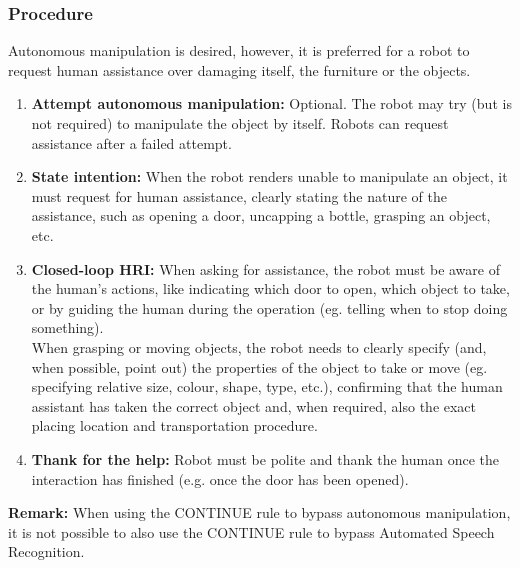 \subsubsection{Procedure}
Autonomous manipulation is desired, however, it is preferred for a robot to request human assistance over damaging itself, the furniture or the objects.
\begin{enumerate}
	\item \textbf{Attempt autonomous manipulation:} Optional. The robot may try (but is not required) to manipulate the object by itself. Robots can request assistance after a failed attempt.

	\item \textbf{State intention:} When the robot renders unable to manipulate an object, it must request for human assistance, clearly stating the nature of the assistance, such as opening a door, uncapping a bottle, grasping an object, etc.

	\item \textbf{Closed-loop HRI:} When asking for assistance, the robot must be aware of the human's actions, like indicating which door to open, which object to take, or by guiding the human during the operation (eg. telling when to stop doing something).\\

	When grasping or moving objects, the robot needs to clearly specify (and, when possible, point out) the properties of the object to take or move (eg. specifying relative size, colour, shape, type, etc.), confirming that the human assistant has taken the correct object and, when required, also the exact placing location and transportation procedure.

	\item \textbf{Thank for the help:} Robot must be polite and thank the human once the interaction has finished (e.g. once the door has been opened).
\end{enumerate}

\textbf{Remark:} When using the CONTINUE rule to bypass autonomous manipulation, it is not possible to also use the CONTINUE rule to bypass Automated Speech Recognition.


